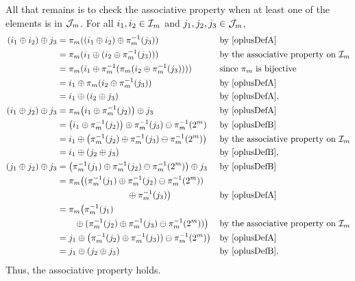 \documentclass[12pt]{amsart}
\begin{document}
All that remains is to check the associative property when at least one of the elements is in $\mathcal{J}_m$.  For all $i_1, i_2 \in \mathcal{I}_m$ and $j_1, j_2, j_3 \in \mathcal{J}_m$, 
\begin{align*}
    (i_1 \oplus i_2) \oplus j_3 & = \pi_m((i_1 \oplus i_2) \oplus \pi_m^{-1}(j_3)) && \text{by } \eqref{oplusDefA} \\
    & = \pi_m(i_1 \oplus (i_2 \oplus \pi_m^{-1}(j_3))) && \text{by the associative property on } \mathcal{I}_m \\
    & = \pi_m(i_1 \oplus \pi_m^{-1}(\pi_m(i_2 \oplus \pi_m^{-1}(j_3)))) && \text{since $\pi_m$ is bijective}\\
    & = i_1 \oplus \pi_m(i_2 \oplus \pi_m^{-1}(j_3)) && \text{by } \eqref{oplusDefA} \\
    & = i_1 \oplus (i_2 \oplus j_3) && \text{by } \eqref{oplusDefA}, \\
    (i_1 \oplus j_2) \oplus j_3 & = \pi_m \bigl(i_1 \oplus \pi_m^{-1}(j_2) \bigr) \oplus j_3 && \text{by } \eqref{oplusDefA} \\
    & = \bigl (i_1 \oplus \pi_m^{-1}(j_2) \bigr) \oplus \pi_m^{-1}(j_3) \ominus \pi_m^{-1}(2^m) && \text{by } \eqref{oplusDefB} \\
    & = i_1 \oplus \bigl (\pi_m^{-1}(j_2) \oplus \pi_m^{-1}(j_3)\ominus \pi_m^{-1}(2^m) \bigr) && \text{by the associative property on } \mathcal{I}_m \\
    & = i_1 \oplus (j_2 \oplus j_3) && \text{by } \eqref{oplusDefB}, \\
    (j_1 \oplus j_2) \oplus j_3 & = \bigl(\pi_m^{-1}(j_1) \oplus \pi_m^{-1}(j_2) \ominus \pi_m^{-1}(2^m) \bigr) \oplus j_3 && \text{by } \eqref{oplusDefB} \\
    & = \pi_m\bigl ((\pi_m^{-1}(j_1) \oplus \pi_m^{-1}(j_2)  \ominus \pi_m^{-1}(2^m)) \\
    &\qquad \qquad \qquad \qquad \oplus \pi_m^{-1}(j_3) \bigr) && \text{by } \eqref{oplusDefA} \\
    & = \pi_m\bigl (\pi_m^{-1}(j_1) \\
    & \qquad  \oplus (\pi_m^{-1}(j_2) \oplus \pi_m^{-1}(j_3)\ominus \pi_m^{-1}(2^m)) \bigr) && \text{by the associative property on } \mathcal{I}_m \\
    & = j_1 \oplus \bigl (\pi_m^{-1}(j_2) \oplus \pi_m^{-1}(j_3)) \ominus \pi_m^{-1}(2^m) \bigr) && \text{by } \eqref{oplusDefA} \\
    & = j_1 \oplus (j_2 \oplus j_3) && \text{by } \eqref{oplusDefB}.
\end{align*}
Thus, the associative property holds.
\end{document}
